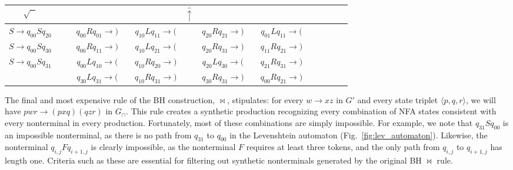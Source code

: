 \documentclass[sigplan,acmsmall,nonacm,screen]{acmart}\settopmatter{printfolios=false,printccs=false,printacmref=false}
\begin{document}
\begin{table}[H]
  \begin{tabular}{cc|ccccccccccccc}
    $\sqrt{\phantom{S}}$ & & & & & & $\hat\uparrow$ & \\\hline
    $S \rightarrow q_{00}Sq_{20}$ & & & $q_{00}Rq_{01} \rightarrow \texttt{)}$ & & $q_{10}Lq_{11} \rightarrow \texttt{(}$ & & $q_{20}Rq_{21} \rightarrow \texttt{)}$ & & $q_{01}Lq_{11} \rightarrow \texttt{(}$ \\
    $S \rightarrow q_{00}Sq_{30}$ & & & $q_{00}Rq_{11} \rightarrow \texttt{)}$ & & $q_{10}Lq_{21} \rightarrow \texttt{(}$ & & $q_{20}Rq_{31} \rightarrow \texttt{)}$ & & $q_{11}Rq_{21} \rightarrow \texttt{)}$ \\
    $S \rightarrow q_{00}Sq_{31}$ & & & $q_{00}Lq_{10} \rightarrow \texttt{(}$ & & $q_{10}Rq_{20} \rightarrow \texttt{)}$ & & $q_{20}Lq_{30} \rightarrow \texttt{(}$ & & $q_{21}Rq_{31} \rightarrow \texttt{)}$ \\
                                  & & & $q_{30}Lq_{31} \rightarrow \texttt{(}$ & & $q_{10}Rq_{31} \rightarrow \texttt{)}$ & & $q_{30}Rq_{31} \rightarrow \texttt{)}$ & & $q_{00}Rq_{21} \rightarrow \texttt{)}$
  \end{tabular}
\end{table}\vspace{-8pt}

The final and most expensive rule of the BH construction, $\Join$, stipulates: for every $w \rightarrow xz$ in $G'$ and every state triplet $\langle p, q, r\rangle$, we will have $pwr \rightarrow (pxq)(qzr)$ in $G_\cap$. This rule creates a synthetic production recognizing every combination of NFA states consistent with every nonterminal in every production. Fortunately, most of these combinations are simply impossible. For example, we note that $q_{31}Sq_{00}$ is an impossible nonterminal, as there is no path from $q_{31}$ to $q_{00}$ in the Levenshtein automaton (Fig.~\ref{fig:lev_automaton}). Likewise, the nonterminal $q_{i, j}Fq_{i+1, j}$ is clearly impossible, as the nonterminal $F$ requires at least three tokens, and the only path from $q_{i, j}$ to $q_{i+1, j}$ has length one. Criteria such as these are essential for filtering out synthetic nonterminals generated by the original BH $\Join$ rule.
\end{document}
